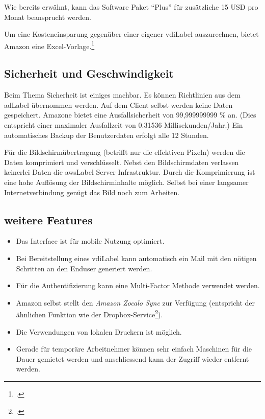 Wie bereits erwähnt, kann das Software Paket "`Plus"' für zusätzliche 15 USD pro Monat beansprucht werden.

Um eine Kosteneinsparung gegenüber einer eigener \Gls{vdiLabel} auszurechnen, bietet Amazon eine Excel-Vorlage.\footcite{TCO_Comparison_Amazon_WorkSpaces_and_Traditional_Virtual_Desktop_Infrastructure_VDI_2014-11-15}

\subsection{Sicherheit und Geschwindigkeit}
Beim Thema Sicherheit ist einiges machbar.
Es können Richtlinien aus dem \Gls{adLabel} übernommen werden.
Auf dem Client selbst werden keine Daten gespeichert.
Amazone bietet eine Ausfallsicherheit von 99,999999999 \% an. (Dies entspricht einer maximaler Ausfallzeit von 0.31536 Millisekunden/Jahr.)
Ein automatisches Backup der Benutzerdaten erfolgt alle 12 Stunden.

Für die Bildschirmübertragung (betrifft nur die effektiven Pixeln) werden die Daten komprimiert und verschlüsselt.
Nebst den Bildschirmdaten verlassen keinerlei Daten die \Gls{awsLabel} Server Infrastruktur.
Durch die Komprimierung ist eine hohe Auflösung der Bildschirminhalte möglich. Selbst bei einer langsamer Internetverbindung genügt das Bild noch zum Arbeiten.

\subsection{weitere Features}
\begin{itemize}
	\item Das Interface ist für mobile Nutzung optimiert.
	\item Bei Bereitstellung eines \Gls{vdiLabel} kann automatisch ein Mail mit den nötigen Schritten an den Enduser generiert werden.
	\item Für die Authentifizierung kann eine Multi-Factor Methode verwendet werden.
	\item Amazon selbst stellt den \textit{Amazon Zocalo Sync} zur Verfügung (entspricht der ähnlichen Funktion wie der Dropbox-Service\footcite{Dropbox_2014-11-15}).
	\item Die Verwendungen von lokalen Druckern ist möglich.
	\item Gerade für temporäre Arbeitnehmer können sehr einfach Maschinen für die Dauer gemietet werden und anschliessend kann der Zugriff wieder entfernt werden.
\end{itemize}

